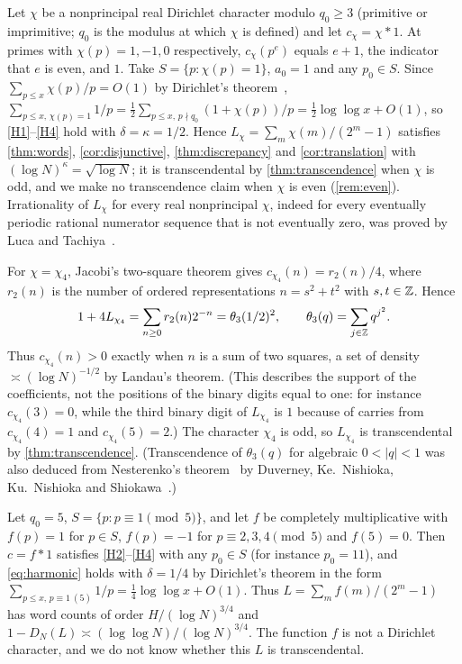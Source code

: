 \documentclass[11pt]{article}
\begin{document}
\begin{example}\label{ex:characters}
Let $\chi$ be a nonprincipal real Dirichlet character modulo $q_0\ge3$
(primitive or imprimitive; $q_0$ is the modulus at which $\chi$ is defined) and
let $c_\chi=\chi*1$. At primes with $\chi(p)=1,-1,0$ respectively,
$c_\chi(p^e)$ equals $e+1$, the indicator that $e$ is even, and $1$. Take
$S=\{p:\chi(p)=1\}$, $a_0=1$ and any $p_0\in S$. Since
$\sum_{p\le x}\chi(p)/p=O(1)$ by Dirichlet's theorem~\cite[Chs.~1 and~4]{Davenport},
$\sum_{p\le x,\,\chi(p)=1}1/p=\tfrac12\sum_{p\le x,\,p\nmid q_0}(1+\chi(p))/p
=\tfrac12\log\log x+O(1)$, so \ref{H1}--\ref{H4} hold with
$\delta=\kappa=1/2$. Hence $L_\chi=\sum_{m}\chi(m)/(2^m-1)$ satisfies
\cref{thm:words}, \cref{cor:disjunctive}, \cref{thm:discrepancy} and
\cref{cor:translation} with $(\log N)^\kappa=\sqrt{\log N}$; it is
transcendental by \cref{thm:transcendence} when $\chi$ is odd, and we make no
transcendence claim when $\chi$ is even (\cref{rem:even}). Irrationality of
$L_\chi$ for every real nonprincipal $\chi$, indeed for every eventually
periodic rational numerator sequence that is not eventually zero, was proved by
Luca and Tachiya~\cite{LucaTachiya2014}.

For $\chi=\chi_4$, Jacobi's two-square theorem gives $c_{\chi_4}(n)=r_2(n)/4$,
where $r_2(n)$ is the number of ordered representations $n=s^2+t^2$ with
$s,t\in\mathbb Z$. Hence
\[
1+4L_{\chi_4}=\sum_{n\ge0}r_2(n)2^{-n}=\theta_3(1/2)^2,\qquad
\theta_3(q)=\sum_{j\in\mathbb Z}q^{j^2}.
\]
Thus $c_{\chi_4}(n)>0$ exactly when $n$ is a sum of two squares, a set of
density $\asymp(\log N)^{-1/2}$ by Landau's theorem. (This describes the support
of the coefficients, not the positions of the binary digits equal to one: for
instance $c_{\chi_4}(3)=0$, while the third binary digit of $L_{\chi_4}$ is $1$
because of carries from $c_{\chi_4}(4)=1$ and $c_{\chi_4}(5)=2$.) The
character $\chi_4$ is odd, so $L_{\chi_4}$ is transcendental by
\cref{thm:transcendence}. (Transcendence of $\theta_3(q)$ for algebraic
$0<|q|<1$ was also deduced from Nesterenko's theorem~\cite{Nesterenko1996} by
Duverney, Ke.~Nishioka, Ku.~Nishioka and Shiokawa~\cite{DNNS1996}.)
\end{example}

\begin{example}\label{ex:quarter}
Let $q_0=5$, $S=\{p:p\equiv1\pmod5\}$, and let $f$ be completely
multiplicative with $f(p)=1$ for $p\in S$, $f(p)=-1$ for $p\equiv2,3,4\pmod5$
and $f(5)=0$. Then $c=f*1$ satisfies \ref{H2}--\ref{H4} with any $p_0\in S$
(for instance $p_0=11$), and \eqref{eq:harmonic} holds with $\delta=1/4$ by
Dirichlet's theorem in the form
$\sum_{p\le x,\,p\equiv1\ (5)}1/p=\tfrac14\log\log x+O(1)$. Thus
$L=\sum_m f(m)/(2^m-1)$ has word counts of order $H/(\log N)^{3/4}$ and
$1-D_N(L)\asymp(\log\log N)/(\log N)^{3/4}$. The function $f$ is not a
Dirichlet character, and we do not know whether this $L$ is transcendental.
\end{example}
\end{document}
